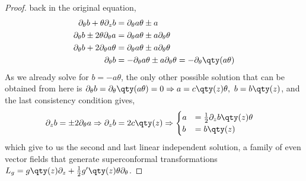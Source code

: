 \begin{proof}
back in the original equation,
\begin{align*}
    \partial_\theta b+\theta\partial_z b&=\partial_\theta a\theta\pm a\\
    \partial_\theta b\pm2\theta\partial_\theta a&=\partial_\theta a\theta\pm a\partial_\theta \theta\\
    \partial_\theta b+2\partial_\theta a\theta&=\partial_\theta a\theta\pm a\partial_\theta \theta\\
    \partial_\theta b&=-\partial_\theta a\theta\pm a\partial_\theta \theta=-\partial_\theta\qty(a\theta)
\end{align*}
As we already solve for $b=-a\theta$, the only other possible solution that can be obtained from here is 
$\partial_\theta b=\partial_\theta\qty(a\theta)=0\Rightarrow a=c\qty(z)\theta,\ b=b\qty(z)$, and the last consistency 
condition gives,
\begin{align*}
    \partial_z b&=\pm 2\partial_\theta a\Rightarrow\partial_z b= 2c\qty(z)\Rightarrow \begin{cases}a &= \frac12 \partial_z b\qty(z)\theta\\b &= b\qty(z)\end{cases} 
\end{align*}
which give to us the second and last linear independent solution, a family of even vector fields that generate 
superconformal transformations $L_g=g\qty(z)\partial_z+\frac12g'\qty(z)\theta\partial_\theta$.
\end{proof}